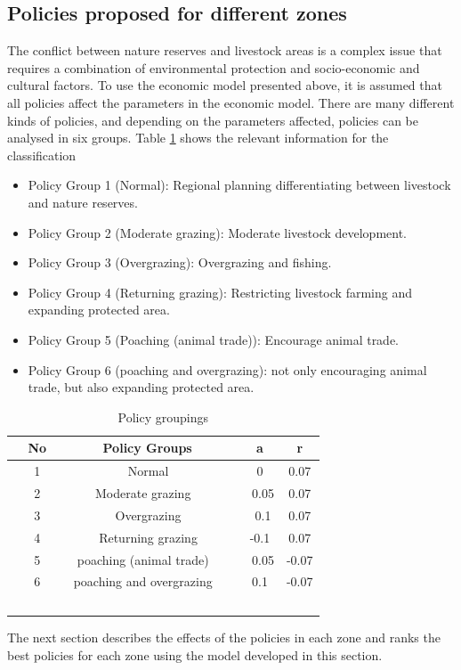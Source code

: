 \documentclass{mcmthesis}
\numberwithin{figure}{section}
\numberwithin{table}{section}
\numberwithin{equation}{section}
\begin{document}
\subsection{Policies proposed for different zones}
The conflict between nature reserves and livestock areas is a complex issue that requires a combination of environmental protection and socio-economic and cultural factors. To use the economic model presented above, it is assumed that all policies affect the parameters in the economic model. There are many different kinds of policies, and depending on the parameters affected, policies can be analysed in six groups. Table \ref{T 5.3} shows the relevant information for the classification
\begin{itemize}
	\item  Policy Group 1 (Normal): Regional planning  differentiating between livestock and nature reserves.
	\item Policy Group 2 (Moderate grazing): Moderate livestock development.
	\item Policy Group 3 (Overgrazing): Overgrazing and fishing.
	\item Policy Group 4 (Returning grazing): Restricting livestock farming and expanding protected area.
	\item Policy Group 5 (Poaching (animal trade)): Encourage animal trade.
	\item Policy Group 6 (poaching and overgrazing): not only encouraging animal trade, but also expanding protected area.		
\end{itemize}

\begin{table}[htbp]
	\centering
	\setlength{\tabcolsep}{9mm}
	\caption{Policy groupings}
	\label{T 5.3}
	\begin{tabular}{cccc}
		\hline
		No & Policy Groups   & a &r \\ \hline
		1 & Normal   & 0&0.07\\
		2 & Moderate grazing    &  0.05& 0.07\\
		3 & Overgrazing   &  0.1& 0.07\\
		4 & Returning grazing  & -0.1& 0.07\\
		5 & poaching (animal trade)    &  0.05& -0.07\\
		6 & poaching and overgrazing    & 0.1&-0.07\\ \hline          
	\end{tabular}
\end{table}

The next section describes the effects of the policies in each zone and ranks the best policies for each zone using the model developed in this section.
\end{document}

